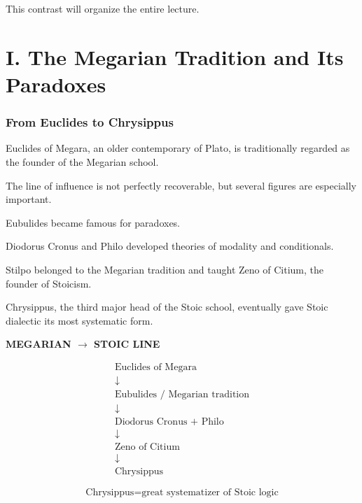 \documentclass[11pt]{article}
\begin{document}
This contrast will organize the entire lecture.


\part*{I. The Megarian Tradition and Its Paradoxes}

\section{From Euclides to Chrysippus}

Euclides of Megara, an older contemporary of Plato, is
traditionally regarded as the founder of the Megarian school.

The line of influence is not perfectly recoverable, but several
figures are especially important.

Eubulides became famous for paradoxes.

Diodorus Cronus and Philo developed theories of modality and
conditionals.

Stilpo belonged to the Megarian tradition and taught Zeno of
Citium, the founder of Stoicism.

Chrysippus, the third major head of the Stoic school, eventually
gave Stoic dialectic its most systematic form.

\begin{whiteboard}
\textbf{MEGARIAN $\rightarrow$ STOIC LINE}

\[
\begin{array}{c}
\text{Euclides of Megara}\\
\downarrow\\
\text{Eubulides / Megarian tradition}\\
\downarrow\\
\text{Diodorus Cronus + Philo}\\
\downarrow\\
\text{Zeno of Citium}\\
\downarrow\\
\boxed{\text{Chrysippus}}
\end{array}
\]

\[
\text{Chrysippus}
=
\text{great systematizer of Stoic logic}
\]
\end{whiteboard}
\end{document}

